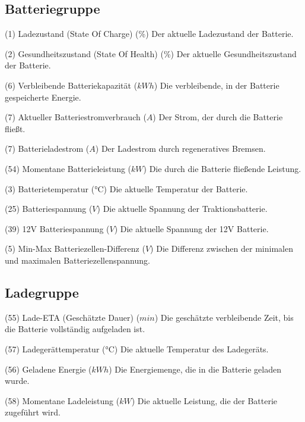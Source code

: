 \subsection{Batteriegruppe}
\label{sec:item_numbers}

{(1) Ladezustand (State Of Charge) (\%)}
{Der aktuelle Ladezustand der Batterie.}

{(2) Gesundheitszustand (State Of Health) (\%)}
{Der aktuelle Gesundheitszustand der Batterie.}

{(6) Verbleibende Batteriekapazität (\(kWh\))}
{Die verbleibende, in der Batterie gespeicherte Energie.}

{(7) Aktueller Batteriestromverbrauch (\(A\))}
{Der Strom, der durch die Batterie fließt.}

{(7) Batterieladestrom (\(A\))}
{Der Ladestrom durch regeneratives Bremsen.}

{(54) Momentane Batterieleistung (\(kW\))}
{Die durch die Batterie fließende Leistung.}

{(3) Batterietemperatur (°C)}
{Die aktuelle Temperatur der Batterie.}

{(25) Batteriespannung (\(V\))}
{Die aktuelle Spannung der Traktionsbatterie.}

{(39) 12V Batteriespannung (\(V\))}
{Die aktuelle Spannung der 12V Batterie.}

{(5) Min-Max Batteriezellen-Differenz (\(V\))}
{Die Differenz zwischen der minimalen und maximalen Batteriezellenspannung.}

\subsection{Ladegruppe}

{(55) Lade-ETA (Geschätzte Dauer) (\(min\))}
{Die geschätzte verbleibende Zeit, bis die Batterie vollständig aufgeladen ist.}

{(57) Ladegerättemperatur (°C)}
{Die aktuelle Temperatur des Ladegeräts.}

{(56) Geladene Energie (\(kWh\))}
{Die Energiemenge, die in die Batterie geladen wurde.}

{(58) Momentane Ladeleistung (\(kW\))}
{Die aktuelle Leistung, die der Batterie zugeführt wird.}

